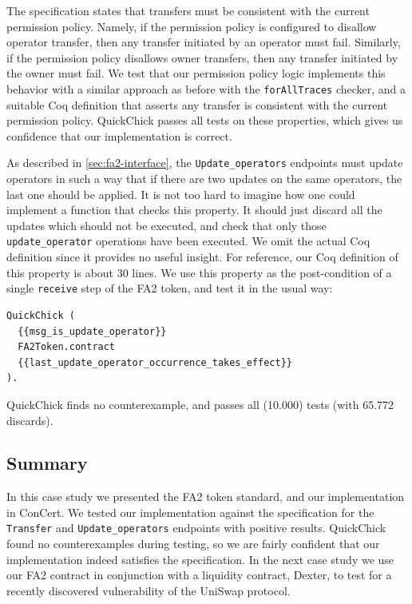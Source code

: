 \documentclass[twoside,11pt,openright]{report}
\newenvironment{code}{\captionsetup{type=figure, singlelinecheck=off, justification=raggedleft}}{}
\newcommand{\coq}[1]{\texttt{#1}}
\begin{document}
The specification states that transfers must be consistent with the current permission policy. Namely, if the permission policy is configured to disallow operator transfer, then any transfer initiated by an operator must fail. Similarly, if the permission policy disallows owner transfers, then any transfer initiated by the owner must fail. We test that our permission policy logic implements this behavior with a similar approach as before with the \coq{forAllTraces} checker, and a suitable Coq definition that asserts any transfer is consistent with the current permission policy. QuickChick passes all tests on these properties, which gives us confidence that our implementation is correct.  

As described in \autoref{sec:fa2-interface}, the \coq{Update\_operators} endpoints must update operators in such a way that if there are two updates on the same operators, the last one should be applied. It is not too hard to imagine how one could implement a function that checks this property. It should just discard all the updates which should not be executed, and check that only those \coq{update\_operator} operations have been executed. We omit the actual Coq definition since it provides no useful insight. For reference, our Coq definition of this property is about 30 lines. We use this property as the post-condition of a single \coq{receive} step of the FA2 token, and test it in the usual way:
\begin{code}
\begin{verbatim}
QuickChick (
  {{msg_is_update_operator}}
  FA2Token.contract
  {{last_update_operator_occurrence_takes_effect}}
).
\end{verbatim}
\end{code}
QuickChick finds no counterexample, and passes all (10.000) tests (with 65.772 discards).
\subsection{Summary}
In this case study we presented the FA2 token standard, and our implementation in ConCert. We tested our implementation against the specification for the \coq{Transfer} and \coq{Update\_operators} endpoints with positive results. QuickChick found no counterexamples during testing, so we are fairly confident that our implementation indeed satisfies the specification. In the next case study we use our FA2 contract in conjunction with a liquidity contract, Dexter, to test for a recently discovered vulnerability of the UniSwap protocol.
\end{document}
